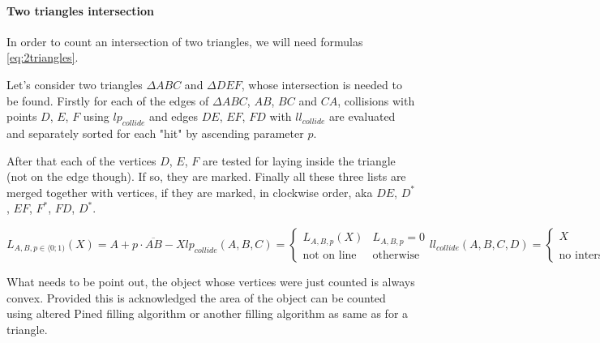 \paragraph{Two triangles intersection}
In order to count an intersection of two triangles, we will need formulas \ref{eq:2triangles}.

Let's consider two triangles $\Delta ABC$ and $\Delta DEF$, whose intersection is needed
to be found. Firstly for each of the edges of $\Delta ABC$, $AB$, $BC$ and $CA$,
collisions with points $D$, $E$, $F$ using $lp_{collide}$ and edges $DE$, $EF$, $FD$
with $ll_{collide}$ are evaluated and separately sorted for each "hit" by ascending
parameter $p$.

After that each of the vertices $D$, $E$, $F$ are tested for laying inside the triangle
(not on the edge though). If so, they are marked. Finally all these three lists are
merged together with vertices, if they are marked, in clockwise order, aka $DE$, $D^{*}$,
$EF$, $F^{*}$, $FD$, $D^{*}$.

\begin{subequations}

\begin{equation}
L_{A,B,p \in \langle 0;1)}(X) = A + p\cdot\overline{AB} - X
\end{equation}

\begin{equation}
lp_{collide}(A,B,C) = \begin{cases} L_{A,B,p}(X)       & L_{A,B,p} = 0 \\
                                    \text{not~on~line} & \text{otherwise}
                        \end{cases}
\end{equation}

\begin{equation}
ll_{collide}(A,B,C,D) = \begin{cases} X                       & lp_{A,B,X} \land L_{C,D,X} \\
                                      \text{no~intersection}  & \text{otherwise}
                        \end{cases}
\end{equation}

\label{eq:2triangles}
\end{subequations}

What needs to be point out, the object whose vertices were just counted is always convex.
Provided this is acknowledged the area of the object can be counted using altered 
Pined filling algorithm or another filling algorithm as same as for a triangle.





